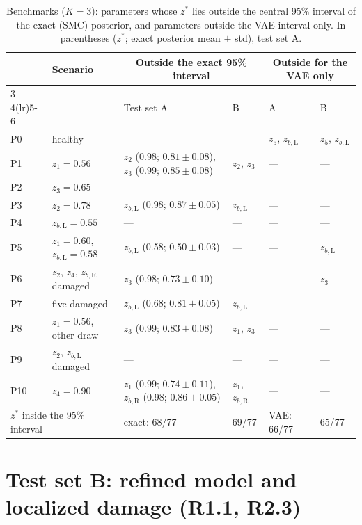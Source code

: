\documentclass[11pt]{article}
\newcommand{\zb}[1]{z_{b,\mathrm{#1}}}
\begin{document}
\begin{table}[t]
\centering\footnotesize
\setlength{\tabcolsep}{4pt}
\caption{Benchmarks ($K=3$): parameters whose $z^*$ lies outside the central 95\% interval of the exact (SMC)
posterior, and parameters outside the VAE interval only. In parentheses ($z^*$; exact posterior mean $\pm$ std),
test set A.}
\label{tab:bench}
\begin{tabular}{l l l l l l}
\toprule
 & Scenario & \multicolumn{2}{c}{Outside the exact 95\% interval} & \multicolumn{2}{c}{Outside for the VAE only} \\
\cmidrule(lr){3-4}\cmidrule(lr){5-6}
 & & Test set A & B & A & B \\
\midrule
P0  & healthy                         & --- & --- & $z_5$, $\zb{L}$ & $z_5$, $\zb{L}$ \\
P1  & $z_1=0.56$                      & $z_2$ (0.98; $0.81\pm0.08$), $z_3$ (0.99; $0.85\pm0.08$) & $z_2$, $z_3$ & --- & --- \\
P2  & $z_3=0.65$                      & --- & --- & --- & --- \\
P3  & $z_2=0.78$                      & $\zb{L}$ (0.98; $0.87\pm0.05$) & $\zb{L}$ & --- & --- \\
P4  & $\zb{L}=0.55$                   & --- & --- & --- & --- \\
P5  & $z_1=0.60$, $\zb{L}=0.58$       & $\zb{L}$ (0.58; $0.50\pm0.03$) & --- & --- & $\zb{L}$ \\
P6  & $z_2$, $z_4$, $\zb{R}$ damaged  & $z_3$ (0.98; $0.73\pm0.10$) & --- & --- & $z_3$ \\
P7  & five damaged                    & $\zb{L}$ (0.68; $0.81\pm0.05$) & $\zb{L}$ & --- & --- \\
P8  & $z_1=0.56$, other draw          & $z_3$ (0.99; $0.83\pm0.08$) & $z_1$, $z_3$ & --- & --- \\
P9  & $z_2$, $\zb{L}$ damaged         & --- & --- & --- & --- \\
P10 & $z_4=0.90$                      & $z_1$ (0.99; $0.74\pm0.11$), $\zb{R}$ (0.98; $0.86\pm0.05$) & $z_1$, $\zb{R}$ & --- & --- \\
\midrule
\multicolumn{2}{l}{$z^*$ inside the 95\% interval} & exact: 68/77 & 69/77 & VAE: 66/77 & 65/77 \\
\bottomrule
\end{tabular}
\end{table}

\section{Test set B: refined model and localized damage (R1.1, R2.3)}\label{sec:testB}
\end{document}

